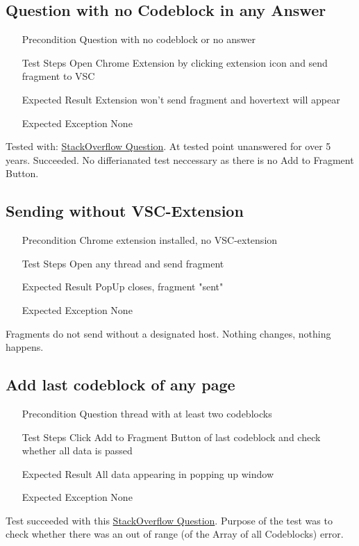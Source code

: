 \documentclass{report}
\begin{document}
\subsection*{Question with no Codeblock in any Answer}
\begin{itemize}
	\item[Precondition] Question with no codeblock or no answer
	\item[Test Steps] Open Chrome Extension by clicking extension icon and send fragment to VSC
	\item[Expected Result] Extension won't send fragment and hovertext will appear
	\item[Expected Exception] None
\end{itemize}
Tested with: \href{https://stackoverflow.com/questions/21446532/jboss-and-intellij-use-jboss-plugin-to-run-and-deploy-or-use-maven}{StackOverflow Question}.
At tested point unanswered for over 5 years. Succeeded. No differianated test neccessary as there is no Add to Fragment Button.

\subsection*{Sending without VSC-Extension}
\begin{itemize}
	\item[Precondition] Chrome extension installed, no VSC-extension
	\item[Test Steps] Open any thread and send fragment
	\item[Expected Result] PopUp closes, fragment "sent"
	\item[Expected Exception] None
\end{itemize}
Fragments do not send without a designated host. Nothing changes, nothing happens.

\subsection*{Add last codeblock of any page}
\begin{itemize}
	\item[Precondition] Question thread with at least two codeblocks
	\item[Test Steps] Click Add to Fragment Button of last codeblock and check whether all data is passed
	\item[Expected Result] All data appearing in popping up window
	\item[Expected Exception] None
\end{itemize}
Test succeeded with this \href{https://stackoverflow.com/questions/442404/retrieve-the-position-x-y-of-an-html-element}{StackOverflow Question}.
Purpose of the test was to check whether there was an out of range (of the Array of all Codeblocks) error.
\end{document}
